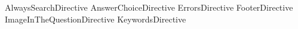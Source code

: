 AlwaysSearchDirective
AnswerChoiceDirective
ErrorsDirective
FooterDirective
ImageInTheQuestionDirective
KeywordsDirective